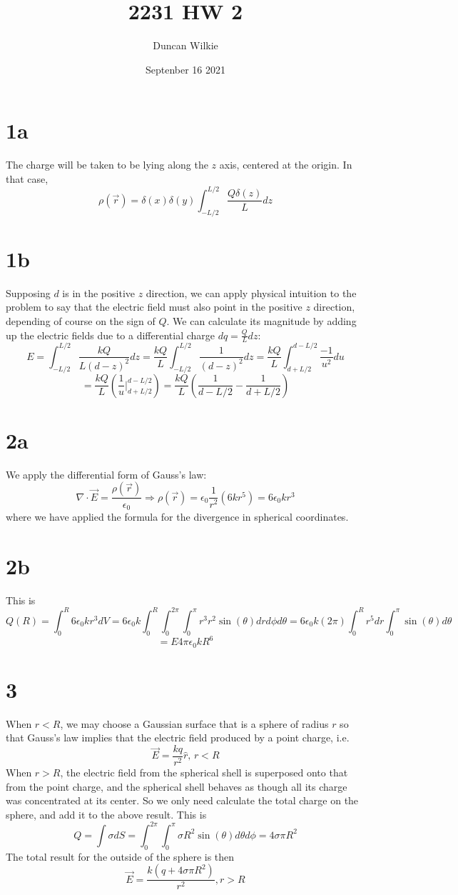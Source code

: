 \documentclass{article}
\title{2231 HW 2}
\author{Duncan Wilkie}
\date{Septenber 16 2021}
\begin{document}
\maketitle

\section*{1a}
The charge will be taken to be lying along the $z$ axis, centered at the origin. In that case, \[\rho(\vec{r})=\delta(x)\delta(y)\int_{-L/2}^{L/2}\frac{Q\delta(z)}{L}dz\]
\section*{1b}
Supposing $d$ is in the positive $z$ direction, we can apply physical intuition to the problem to say that the electric field must also point in the positive $z$ direction, depending of course on the sign of $Q$.
We can calculate its magnitude by adding up the electric fields due to a differential charge $dq = \frac{Q}{L}dz$:
\[E=\int_{-L/2}^{L/2}\frac{kQ}{L(d-z)^2}dz=\frac{kQ}{L}
  \int_{-L/2}^{L/2}\frac{1}{(d-z)^2}dz = \frac{kQ}{L}\int_{d+L/2}^{d-L/2}\frac{-1}{u^2}du\]
\[=\frac{kQ}{L}\left(\frac{1}{u}\bigg|_{d+L/2}^{d-L/2}\right)=\frac{kQ}{L}\left(\frac{1}{d-L/2}-\frac{1}{d+L/2}\right)\]
\section*{2a}
We apply the differential form of Gauss's law: \[\nabla\cdot \vec{E} = \frac{\rho(\vec{r})}{\epsilon_0}\Rightarrow \rho(\vec{r})= \epsilon_0\frac{1}{r^2}(6kr^5)=6\epsilon_0kr^3\]
where we have applied the formula for the divergence in spherical coordinates.
\section*{2b}
This is \[Q(R)=\int_0^R6\epsilon_0kr^3dV=6\epsilon_0k\int_0^R\int_0^{2\pi}\int_0^\pi r^3r^2\sin(\theta)drd\phi d\theta=6\epsilon_0k(2\pi)\int_0^Rr^5dr\int_0^\pi\sin(\theta)d\theta\]
\[=E 4\pi\epsilon_0kR^6\]
\section*{3}
When $r<R$, we may choose a Gaussian surface that is a sphere of radius $r$ so that Gauss's law implies that the electric field produced by a point charge, i.e. \[\vec{E}=\frac{kq}{r^2}\hat{r}\textrm{,  }r<R\]
When $r>R$, the electric field from the spherical shell is superposed onto that from the point charge, and the spherical shell behaves as though all its charge was concentrated at its center. So we only need calculate the total charge on the sphere, and add it to the above result. This is \[Q=\int\sigma dS=\int_0^{2\pi}\int_0^\pi\sigma R^2\sin(\theta)d\theta d\phi=4\sigma\pi R^2\]
The total result for the outside of the sphere is then \[\vec{E}=\frac{k(q+4\sigma\pi R^2)}{r^2}, r>R\]
\end{document}
